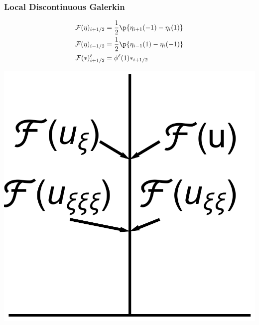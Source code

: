 \documentclass[10pt]{beamer}
\begin{document}
    \begin{frame}
      \frametitle{Local Discontinuous Galerkin}
      \begin{align*}
        \mcF(\eta)_{i+1/2} &= \frac{1}{2}\p{\eta_{i+1}(-1) - \eta_{i}(1)} \\
        \mcF(\eta)_{i-1/2} &= \frac{1}{2}\p{\eta_{i-1}(1) - \eta_{i}(-1)} \\
        \mcF(*)_{i+1/2}^{\ell} &= \phi^{\ell}(1) *_{i+1/2}
      \end{align*}
      \begin{center}
        \includegraphics[scale=0.3]{Figures/localDG.pdf}
      \end{center}
    \end{frame}
\end{document}
